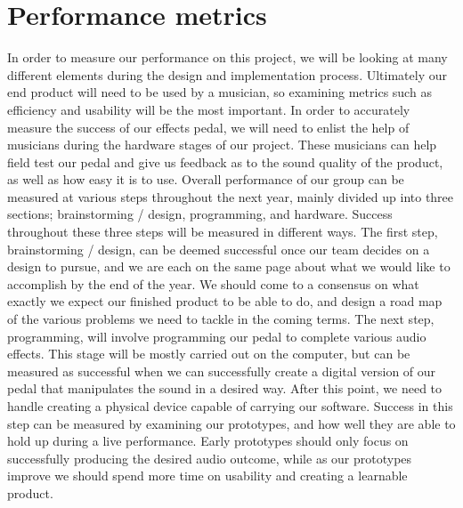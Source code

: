 \documentclass[onecolumn, draftclsnofoot,10pt, compsoc]{IEEEtran}
\begin{document}
\section{Performance metrics}
In order to measure our performance on this project, we will be looking at many different elements during the design and implementation process. Ultimately our end product will need to be used by a musician, so examining metrics such as efficiency and usability will be the most important. In order to accurately measure the success of our effects pedal, we will need to enlist the help of musicians during the hardware stages of our project. These musicians can help field test our pedal and give us feedback as to the sound quality of the product, as well as how easy it is to use. Overall performance of our group can be measured at various steps throughout the next year, mainly divided up into three sections; brainstorming / design, programming, and hardware. Success throughout these three steps will be measured in different ways. The first step, brainstorming / design, can be deemed successful once our team decides on a design to pursue, and we are each on the same page about what we would like to accomplish by the end of the year. We should come to a consensus on what exactly we expect our finished product to be able to do, and design a road map of the various problems we need to tackle in the coming terms. The next step, programming, will involve programming our pedal to complete various audio effects. This stage will be mostly carried out on the computer, but can be measured as successful when we can successfully create a digital version of our pedal that manipulates the sound in a desired way. After this point, we need to handle creating a physical device capable of carrying our software. Success in this step can be measured by examining our prototypes, and how well they are able to hold up during a live performance. Early prototypes should only focus on successfully producing the desired audio outcome, while as our prototypes improve we should spend more time on usability and creating a learnable product. 
\end{document}
